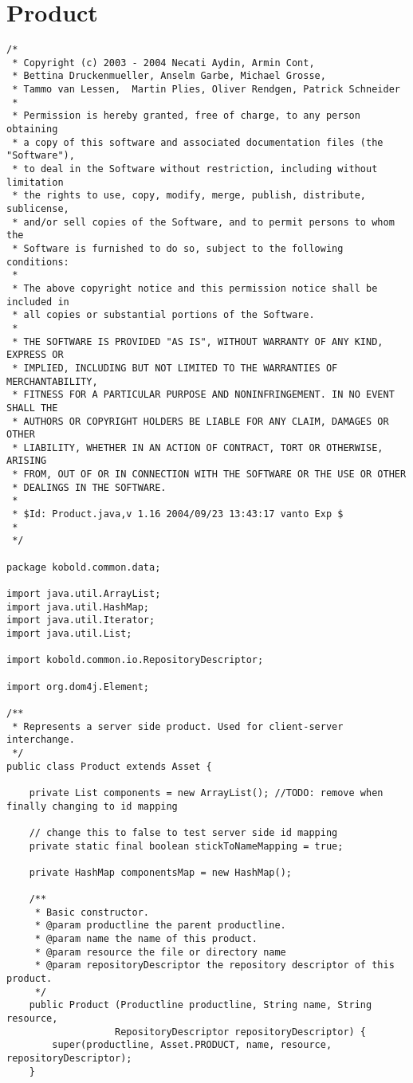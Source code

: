 \section{Product}
\small \begin{verbatim}
/*
 * Copyright (c) 2003 - 2004 Necati Aydin, Armin Cont, 
 * Bettina Druckenmueller, Anselm Garbe, Michael Grosse, 
 * Tammo van Lessen,  Martin Plies, Oliver Rendgen, Patrick Schneider
 * 
 * Permission is hereby granted, free of charge, to any person obtaining
 * a copy of this software and associated documentation files (the "Software"),
 * to deal in the Software without restriction, including without limitation
 * the rights to use, copy, modify, merge, publish, distribute, sublicense, 
 * and/or sell copies of the Software, and to permit persons to whom the 
 * Software is furnished to do so, subject to the following conditions:
 *
 * The above copyright notice and this permission notice shall be included in 
 * all copies or substantial portions of the Software.
 *
 * THE SOFTWARE IS PROVIDED "AS IS", WITHOUT WARRANTY OF ANY KIND, EXPRESS OR 
 * IMPLIED, INCLUDING BUT NOT LIMITED TO THE WARRANTIES OF MERCHANTABILITY, 
 * FITNESS FOR A PARTICULAR PURPOSE AND NONINFRINGEMENT. IN NO EVENT SHALL THE 
 * AUTHORS OR COPYRIGHT HOLDERS BE LIABLE FOR ANY CLAIM, DAMAGES OR OTHER 
 * LIABILITY, WHETHER IN AN ACTION OF CONTRACT, TORT OR OTHERWISE, ARISING 
 * FROM, OUT OF OR IN CONNECTION WITH THE SOFTWARE OR THE USE OR OTHER 
 * DEALINGS IN THE SOFTWARE.
 *
 * $Id: Product.java,v 1.16 2004/09/23 13:43:17 vanto Exp $
 *
 */

package kobold.common.data;

import java.util.ArrayList;
import java.util.HashMap;
import java.util.Iterator;
import java.util.List;

import kobold.common.io.RepositoryDescriptor;

import org.dom4j.Element;

/**
 * Represents a server side product. Used for client-server interchange.
 */
public class Product extends Asset {

	private List components = new ArrayList(); //TODO: remove when finally changing to id mapping
    
    // change this to false to test server side id mapping
    private static final boolean stickToNameMapping = true;

    private HashMap componentsMap = new HashMap();
	
	/**
	 * Basic constructor.
	 * @param productline the parent productline.
	 * @param name the name of this product.
	 * @param resource the file or directory name
	 * @param repositoryDescriptor the repository descriptor of this product.
	 */
	public Product (Productline productline, String name, String resource,
	               RepositoryDescriptor repositoryDescriptor) {
		super(productline, Asset.PRODUCT, name, resource, repositoryDescriptor);
	}
	

\end{verbatim}
